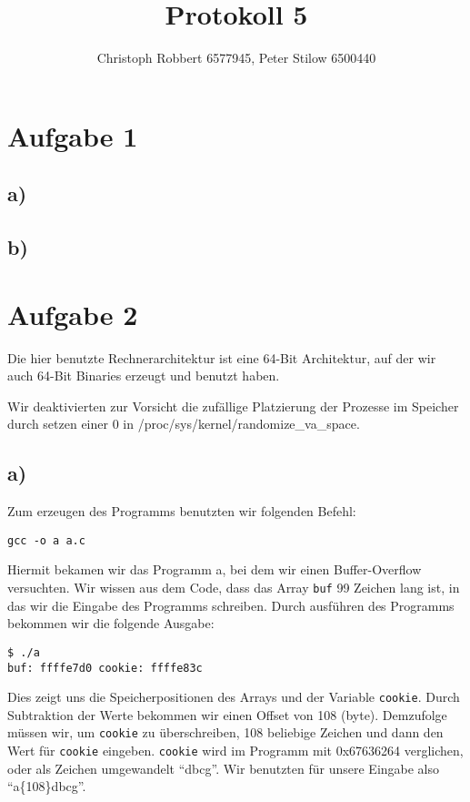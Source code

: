 \documentclass[10pt,a4paper]{article}
\author{Christoph Robbert 6577945, Peter Stilow 6500440}
\title{Protokoll 5}
\begin{document}
\maketitle
 
\section*{Aufgabe 1}

\subsection*{a)}



\subsection*{b)}



\section*{Aufgabe 2}

Die hier benutzte Rechnerarchitektur ist eine 64-Bit Architektur, auf der wir auch 64-Bit Binaries erzeugt und benutzt haben.

Wir deaktivierten zur Vorsicht die zufällige Platzierung der Prozesse im Speicher durch setzen einer 0 in /proc/sys/kernel/randomize\_va\_space.

\subsection*{a)}

Zum erzeugen des Programms benutzten wir folgenden Befehl:
\begin{verbatim}
gcc -o a a.c
\end{verbatim}

Hiermit bekamen wir das Programm a, bei dem wir einen Buffer-Overflow versuchten. Wir wissen aus dem Code, dass das Array \texttt{buf} 99 Zeichen lang ist, in das wir die Eingabe des Programms schreiben. Durch ausführen des Programms bekommen wir die folgende Ausgabe:
\begin{verbatim}
$ ./a
buf: ffffe7d0 cookie: ffffe83c
\end{verbatim}

Dies zeigt uns die Speicherpositionen des Arrays und der Variable \texttt{cookie}. Durch Subtraktion der Werte bekommen wir einen Offset von 108 (byte). Demzufolge müssen wir, um \texttt{cookie} zu überschreiben, 108 beliebige Zeichen und dann den Wert für \texttt{cookie} eingeben. \texttt{cookie} wird im Programm mit 0x67636264 verglichen, oder als Zeichen umgewandelt "`dbcg"'. Wir benutzten für unsere Eingabe also "`a\{108\}dbcg"'.
\end{document}
